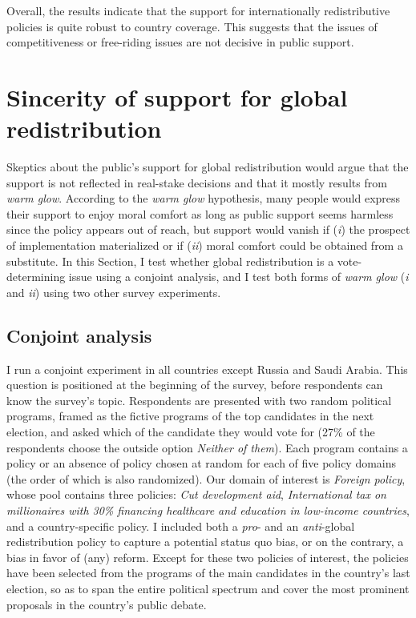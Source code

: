 \documentclass[12pt,english]{article}
\begin{document}
\begin{bibunit}
Overall, the results indicate that the support for internationally redistributive policies is quite robust to country coverage. This suggests that the issues of competitiveness or free-riding issues are not decisive in public support. %

\section{Sincerity of support for global redistribution\label{sec:sincerity}}

Skeptics about the public's support for global redistribution would argue that the support is not reflected in real-stake decisions and that it mostly results from \textit{warm glow}. According to the \textit{warm glow} hypothesis, many people would express their support to enjoy moral comfort as long as public support seems harmless since the policy appears out of reach, but support would vanish if (\textit{i}) the prospect of implementation materialized or if (\textit{ii}) moral comfort could be obtained from a substitute. In this Section, I test whether global redistribution is a vote-determining issue using a conjoint analysis, and I test both forms of \textit{warm glow} (\textit{i} and \textit{ii}) using two other survey experiments.

\subsection{Conjoint analysis}\label{subsec:conjoint}

I run a conjoint experiment in all countries except Russia and Saudi Arabia. This question is positioned at the beginning of the survey, before respondents can know the survey's topic. Respondents are presented with two random political programs, framed as the fictive programs of the top candidates in the next election, and asked which of the candidate they would vote for (27\% of the respondents choose the outside option \textit{Neither of them}). Each program contains a policy or an absence of policy chosen at random for each of five policy domains (the order of which is also randomized). %
Our domain of interest is \textit{Foreign policy}, whose pool contains three policies: \textit{Cut development aid}, \textit{International tax on millionaires with 30\% financing healthcare and education in low-income countries}, and a country-specific policy. %
I included both a \textit{pro}- and an \textit{anti}-global redistribution policy to capture a potential status quo bias, or on the contrary, a bias in favor of (any) reform. 
Except for these two policies of interest, the policies have been selected from the programs of the main candidates in the country's last election, so as to span the entire political spectrum and cover the most prominent proposals in the country's public debate. 


\end{bibunit}
\end{document}
